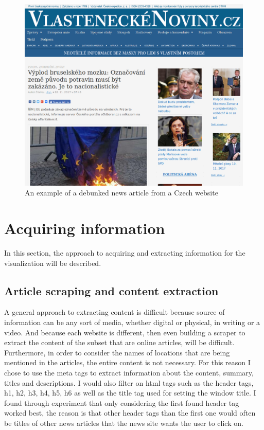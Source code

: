 \documentclass{article}
\begin{document}
\begin{figure}[H]
    \centering
    \caption{An example of a debunked news article from a Czech website}
    \label{fig:fake_source}
    \includegraphics[width=.9\textwidth]{images/example_source.png}
\end{figure}

\section{Acquiring information}
In this section, the approach to acquiring and extracting information for the visualization will be described.

\subsection{Article scraping and content extraction}
A general approach to extracting content is difficult because source of information can be any sort of media, whether digital or physical, in writing or a video. And because each website is different, then even building a scraper to extract the content of the subset that are online articles, will be difficult. Furthermore, in order to consider the names of locations that are being mentioned in the articles, the entire content is not necessary. For this reason I chose to use the meta tags to extract information about the content, summary, titles and descriptions. I would also filter on html tags such as the header tags, h1, h2, h3, h4, h5, h6 as well as the title tag used for setting the window title. I found through experiment that only considering the first found header tag worked best, the reason is that other header tags than the first one would often be titles of other news articles that the news site wants the user to click on.
\end{document}
